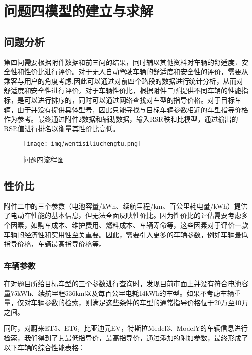 \documentclass[withoutpreface,bwprint]{cumcmthesis} %
\begin{document}
\section{问题四模型的建立与求解}

\subsection{问题分析}
第四问需要根据附件数据和前三问的结果，同时辅以其他资料对车辆的舒适度，安全性和性价比进行评价。对于无人自动驾驶车辆的舒适度和安全性的评价，需要从乘客与用户的角度考虑,因此可以通过对前四个路段的数据进行统计分析，从而对舒适度和安全性进行评价。对于车辆性价比，根据附件二所提供不同车辆的性能指标，是可以进行排序的，同时可以通过网络查找对车型的指导价格。对于目标车辆，由于并没有提供具体型号，因此只能寻找与目标车辆参数相近的车型指导价格作为参考。最终通过附件2数据和辅助数据，输入RSR秩和比模型，通过输出的RSR值进行排名以衡量其性价比高低。

\begin{figure}[htbp]
    \centering
    \texttt{[image: img/wentisiliuchengtu.png]}
     \captionsetup{font=small, position=below}
    \caption{问题四流程图}
    
\end{figure}

\subsection{性价比}
附件二中的三个参数（电池容量/kWh、续航里程/km、百公里耗电量/kWh）提供了电动车性能的基本信息，但无法全面反映性价比。因为性价比的评估需要考虑多个因素，如购车成本、维护费用、燃料成本、车辆寿命等，这些因素对于评价一款车辆的经济性和实用性至关重要。因此，需要引入更多的车辆参数，例如车辆最低指导价格，车辆最高指导价格等。


\subsubsection{车辆参数}
在对题目所给目标车型的三个参数进行查询时，发现目前市面上并没有符合电池容量75kWh、续航里程536km以及每百公里电耗14kWh的车型。如果不考虑车辆重量，仅对车辆参数的检索，则满足这些条件的车型的通常指导价格位于20万至40万之间。

同时，对蔚来ET5、ET6，比亚迪元EV，特斯拉Model3、ModelY的车辆信息进行检索，我们得到了其最低指导价，最高指导价，通过添加的附加参数，最终形成了以下车辆的综合性能表格：
\end{document}
